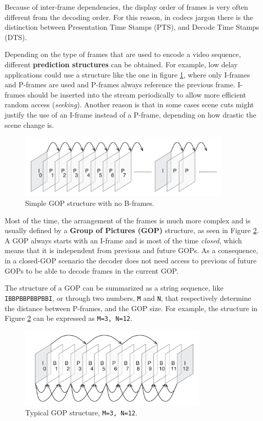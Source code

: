 Because of inter-frame dependencies, the display order of frames is very often different from the decoding order. For this reason, in codecs jargon there is the distinction between Presentation Time Stamps (PTS), and Decode Time Stamps (DTS).

Depending on the type of frames that are used to encode a video sequence, different \textbf{prediction structures} can be obtained. For example, low delay applications could use a structure like the one in figure \ref{fig:codec_gop1}, where only I-frames and P-frames are used and P-frames always reference the previous frame. I-frames should be inserted into the stream periodically to allow more efficient random access (\textit{seeking}). Another reason is that in some cases scene cuts might justify the use of an I-frame instead of a P-frame, depending on how drastic the scene change is.

\begin{figure}
	\centering
	
	\includegraphics[width=0.9\textwidth]{res/gop1.png}
	
	\caption{Simple GOP structure with no B-frames.}
	\label{fig:codec_gop1}
\end{figure}

Most of the time, the arrangement of the frames is much more complex and is usually defined by a \textbf{Group of Pictures (GOP)} structure, as seen in Figure \ref{fig:codec_gop2}. A GOP always starts with an I-frame and is most of the time \textit{closed}, which means that it is independent from previous and future GOPs. As a consequence, in a closed-GOP scenario the decoder does not need access to previous of future GOPs to be able to decode frames in the current GOP.

The structure of a GOP can be summarized as a string sequence, like \texttt{IBBPBBPBBPBBI}, or through two numbers, \texttt{M} and \texttt{N}, that respectively determine the distance between P-frames, and the GOP size. For example, the structure in Figure \ref{fig:codec_gop2} can be expressed as \texttt{M=3, N=12}.

\begin{figure}
	\centering
	
	\includegraphics[width=0.8\textwidth]{res/gop2.png}
	
	\caption{Typical GOP structure, \texttt{M=3, N=12}.}
	\label{fig:codec_gop2}
\end{figure}

